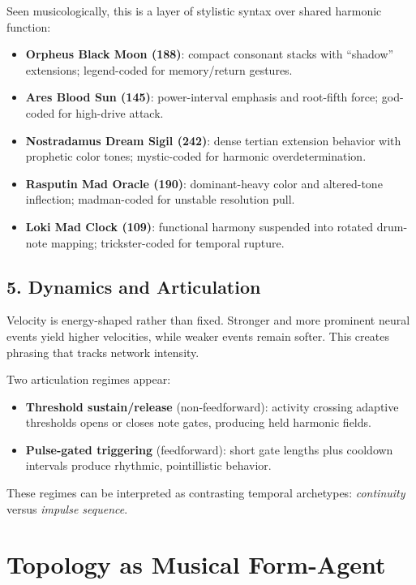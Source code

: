\documentclass[11pt,a4paper]{article}
\begin{document}
Seen musicologically, this is a layer of stylistic syntax over shared harmonic function:
\begin{itemize}
    \item \textbf{Orpheus Black Moon (188)}: compact consonant stacks with ``shadow'' extensions;
    legend-coded for memory/return gestures.
    \item \textbf{Ares Blood Sun (145)}: power-interval emphasis and root-fifth force;
    god-coded for high-drive attack.
    \item \textbf{Nostradamus Dream Sigil (242)}: dense tertian extension behavior with prophetic color tones;
    mystic-coded for harmonic overdetermination.
    \item \textbf{Rasputin Mad Oracle (190)}: dominant-heavy color and altered-tone inflection;
    madman-coded for unstable resolution pull.
    \item \textbf{Loki Mad Clock (109)}: functional harmony suspended into rotated drum-note mapping;
    trickster-coded for temporal rupture.
\end{itemize}

\subsection*{5. Dynamics and Articulation}

Velocity is energy-shaped rather than fixed. Stronger and more prominent neural events yield
higher velocities, while weaker events remain softer. This creates phrasing that tracks
network intensity.

Two articulation regimes appear:
\begin{itemize}
    \item \textbf{Threshold sustain/release} (non-feedforward): activity crossing adaptive thresholds
    opens or closes note gates, producing held harmonic fields.
    \item \textbf{Pulse-gated triggering} (feedforward): short gate lengths plus cooldown intervals
    produce rhythmic, pointillistic behavior.
\end{itemize}

These regimes can be interpreted as contrasting temporal archetypes:
\emph{continuity} versus \emph{impulse sequence}.

\section*{Topology as Musical Form-Agent}
\end{document}
